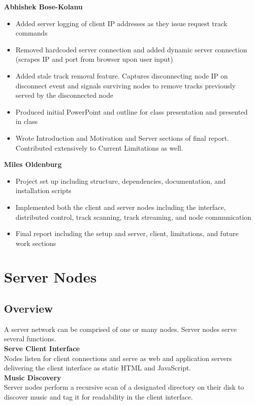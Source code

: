 \documentclass[12pt]{article}
\begin{document}
\textbf{Abhishek Bose-Kolanu}
\begin{itemize}
\item Added server logging of client IP addresses as they issue request track commands
\item Removed hardcoded server connection and added dynamic server connection (scrapes IP and port from browser upon user input)
\item Added stale track removal feature. Captures disconnecting node IP on disconnect event and signals surviving nodes to remove tracks previously served by the disconnected node
\item Produced initial PowerPoint and outline for class presentation and presented in class
\item Wrote Introduction and Motivation and Server sections of final report. Contributed extensively to Current Limitations as well.
\end{itemize}

\textbf{Miles Oldenburg}
\begin{itemize}
\item Project set up including structure, dependencies, documentation, and installation scripts
\item Implemented both the client and server nodes including the interface, distributed control, track scanning, track streaming, and node communication
\item Final report including the setup and server, client, limitations, and future work sections
\end{itemize}

\section{Server Nodes}

\subsection{Overview}
A server network can be comprised of one or many nodes. Server nodes serve several functions.\\

\textbf{Serve Client Interface}\\
Nodes listen for client connections and serve as web and application servers delivering the client interface as static HTML and JavaScript.\\

\textbf{Music Discovery}\\
Server nodes perform a recursive scan of a designated directory on their disk to discover music and tag it for readability in the client interface.\\
\end{document}
